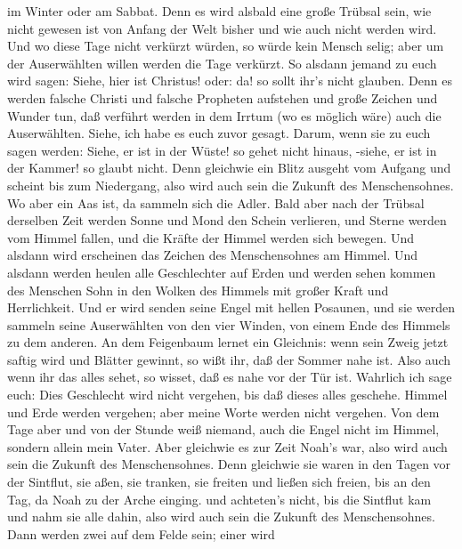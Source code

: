 im Winter oder am Sabbat.  Denn es wird alsbald eine große
Trübsal sein, wie nicht gewesen ist von Anfang der Welt bisher und wie
auch nicht werden wird.  Und wo diese Tage nicht verkürzt
würden, so würde kein Mensch selig; aber um der Auserwählten willen
werden die Tage verkürzt.  So alsdann jemand zu euch wird
sagen: Siehe, hier ist Christus! oder: da! so sollt ihr's nicht glauben.
 Denn es werden falsche Christi und falsche Propheten
aufstehen und große Zeichen und Wunder tun, daß verführt werden in dem
Irrtum (wo es möglich wäre) auch die Auserwählten.  Siehe,
ich habe es euch zuvor gesagt.  Darum, wenn sie zu euch
sagen werden: Siehe, er ist in der Wüste! so gehet nicht hinaus, -siehe,
er ist in der Kammer! so glaubt nicht.  Denn gleichwie ein
Blitz ausgeht vom Aufgang und scheint bis zum Niedergang, also wird auch
sein die Zukunft des Menschensohnes.  Wo aber ein Aas ist,
da sammeln sich die Adler.  Bald aber nach der Trübsal
derselben Zeit werden Sonne und Mond den Schein verlieren, und Sterne
werden vom Himmel fallen, und die Kräfte der Himmel werden sich bewegen.
 Und alsdann wird erscheinen das Zeichen des Menschensohnes
am Himmel. Und alsdann werden heulen alle Geschlechter auf Erden und
werden sehen kommen des Menschen Sohn in den Wolken des Himmels mit
großer Kraft und Herrlichkeit.  Und er wird senden seine
Engel mit hellen Posaunen, und sie werden sammeln seine Auserwählten von
den vier Winden, von einem Ende des Himmels zu dem anderen.
 An dem Feigenbaum lernet ein Gleichnis: wenn sein Zweig
jetzt saftig wird und Blätter gewinnt, so wißt ihr, daß der Sommer nahe
ist.  Also auch wenn ihr das alles sehet, so wisset, daß es
nahe vor der Tür ist.  Wahrlich ich sage euch: Dies
Geschlecht wird nicht vergehen, bis daß dieses alles geschehe.
 Himmel und Erde werden vergehen; aber meine Worte werden
nicht vergehen.  Von dem Tage aber und von der Stunde weiß
niemand, auch die Engel nicht im Himmel, sondern allein mein Vater.
 Aber gleichwie es zur Zeit Noah's war, also wird auch sein
die Zukunft des Menschensohnes.  Denn gleichwie sie waren
in den Tagen vor der Sintflut, sie aßen, sie tranken, sie freiten und
ließen sich freien, bis an den Tag, da Noah zu der Arche einging.
 und achteten's nicht, bis die Sintflut kam und nahm sie
alle dahin, also wird auch sein die Zukunft des Menschensohnes.
 Dann werden zwei auf dem Felde sein; einer wird
